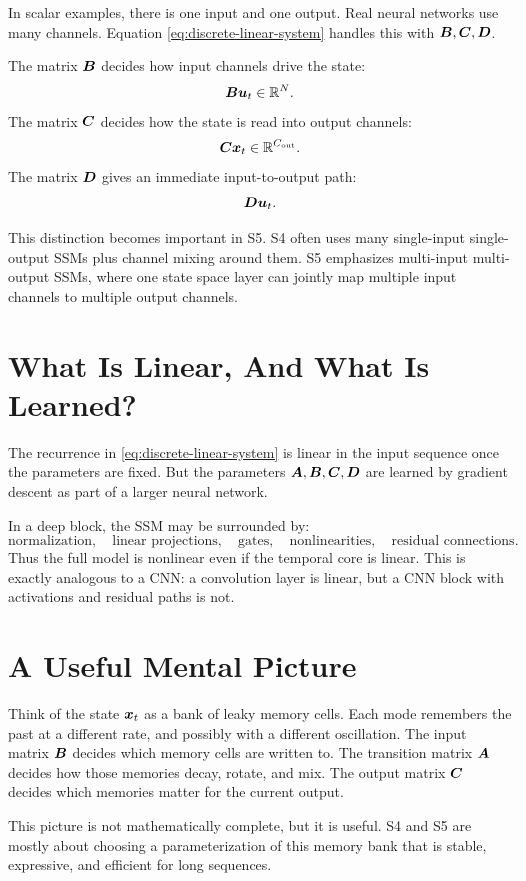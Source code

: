 In scalar examples, there is one input and one output. Real neural networks use many
channels. Equation \eqref{eq:discrete-linear-system} handles this with $\bm{B},\bm{C},\bm{D}$.

The matrix $\bm{B}$ decides how input channels drive the state:
\[
  \bm{B} \bm{u}_t \in \mathbb{R}^N.
\]
The matrix $\bm{C}$ decides how the state is read into output channels:
\[
  \bm{C} \bm{x}_t \in \mathbb{R}^{C_{\mathrm{out}}}.
\]
The matrix $\bm{D}$ gives an immediate input-to-output path:
\[
  \bm{D}\bm{u}_t.
\]

This distinction becomes important in S5. S4 often uses many single-input single-output
SSMs plus channel mixing around them. S5 emphasizes multi-input multi-output SSMs, where
one state space layer can jointly map multiple input channels to multiple output channels.

\section{What Is Linear, And What Is Learned?}

The recurrence in \eqref{eq:discrete-linear-system} is linear in the input sequence once
the parameters are fixed. But the parameters $\bm{A},\bm{B},\bm{C},\bm{D}$ are learned by gradient
descent as part of a larger neural network.

In a deep block, the SSM may be surrounded by:
\[
  \text{normalization},\quad
  \text{linear projections},\quad
  \text{gates},\quad
  \text{nonlinearities},\quad
  \text{residual connections}.
\]
Thus the full model is nonlinear even if the temporal core is linear. This is exactly
analogous to a CNN: a convolution layer is linear, but a CNN block with activations and
residual paths is not.

\section{A Useful Mental Picture}

Think of the state $\bm{x}_t$ as a bank of leaky memory cells. Each mode remembers the past
at a different rate, and possibly with a different oscillation. The input matrix $\bm{B}$
decides which memory cells are written to. The transition matrix $\bm{A}$ decides how those
memories decay, rotate, and mix. The output matrix $\bm{C}$ decides which memories matter for
the current output.

This picture is not mathematically complete, but it is useful. S4 and S5 are mostly about
choosing a parameterization of this memory bank that is stable, expressive, and efficient
for long sequences.

